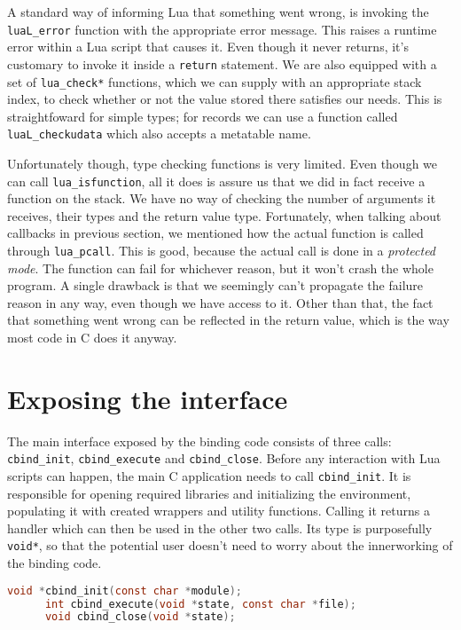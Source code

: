 \documentclass[polish, english]{iithesis}
\begin{document}
    A standard way of informing Lua that something went wrong, is invoking the \texttt{luaL\_error} function with the appropriate error message.
    This raises a runtime error within a Lua script that causes it.
    Even though it never returns, it's customary to invoke it inside a \texttt{return} statement.
    We are also equipped with a set of \texttt{lua\_check*} functions, which we can supply with an appropriate stack index, to check whether or not the value stored there satisfies our needs.
    This is straightfoward for simple types; for records we can use a function called \texttt{luaL\_checkudata} which also accepts a metatable name.

    Unfortunately though, type checking functions is very limited.
    Even though we can call \texttt{lua\_isfunction}, all it does is assure us that we did in fact receive a function on the stack.
    We have no way of checking the number of arguments it receives, their types and the return value type.
    Fortunately, when talking about callbacks in previous section, we mentioned how the actual function is called through \texttt{lua\_pcall}.
    This is good, because the actual call is done in a \textit{protected mode}.
    The function can fail for whichever reason, but it won't crash the whole program.
    A single drawback is that we seemingly can't propagate the failure reason in any way, even though we have access to it.
    Other than that, the fact that something went wrong can be reflected in the return value, which is the way most code in C does it anyway.

  \section{Exposing the interface}
    The main interface exposed by the binding code consists of three calls: \texttt{cbind\_init}, \texttt{cbind\_execute} and \texttt{cbind\_close}.
    Before any interaction with Lua scripts can happen, the main C application needs to call \texttt{cbind\_init}.
    It is responsible for opening required libraries and initializing the environment, populating it with created wrappers and utility functions.
    Calling it returns a handler which can then be used in the other two calls.
    Its type is purposefully \texttt{void*}, so that the potential user doesn't need to worry about the innerworking of the binding code.

    \begin{lstlisting}[caption=Interface singatures, language=c]
      void *cbind_init(const char *module);
      int cbind_execute(void *state, const char *file);
      void cbind_close(void *state);
    \end{lstlisting}
\end{document}
